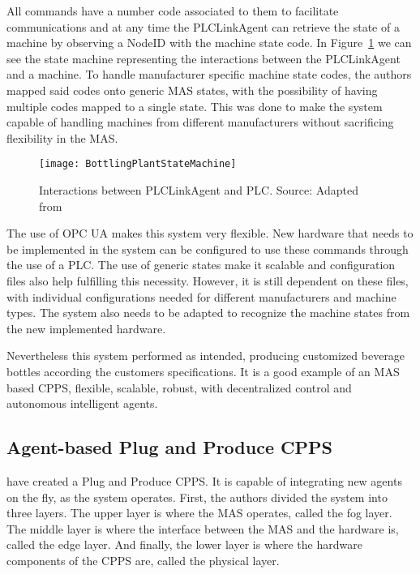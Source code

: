All commands have a number code associated to them to facilitate communications and at any time the PLCLinkAgent can retrieve the state of a machine by observing a NodeID with the machine state code. In Figure~\ref{fig:bottling_plant_state_achine} we can see the state machine representing the interactions between the PLCLinkAgent and a machine. To handle manufacturer specific machine state codes, the authors mapped said codes onto generic MAS states, with the possibility of having multiple codes mapped to a single state. This was done to make the system capable of handling machines from different manufacturers without sacrificing flexibility in the MAS.

\begin{figure}[hbt!]
	\centering
	\texttt{[image: BottlingPlantStateMachine]}
	\caption{Interactions between PLCLinkAgent and PLC. Source: Adapted from \cite{bottling_plant_part2}}
	\label{fig:bottling_plant_state_achine}
\end{figure}

The use of OPC UA makes this system very flexible. New hardware that needs to be implemented in the system can be configured to use these commands through the use of a PLC. The use of generic states make it scalable and configuration files also help fulfilling this necessity. However, it is still dependent on these files, with individual configurations needed for different manufacturers and machine types. The system also needs to be adapted to recognize the machine states from the new implemented hardware.

Nevertheless this system performed as intended, producing customized beverage bottles according the customers specifications. It is a good example of an MAS based CPPS, flexible, scalable, robust, with decentralized control and autonomous intelligent agents.
 
\subsection{Agent-based Plug and Produce CPPS}
\label{agent_plug_and_produce}

\citeauthor{8972169} \cite{8972169} have created a Plug and Produce CPPS. It is capable of integrating new agents on the fly, as the system operates. First, the authors divided the system into three layers. The upper layer is where the MAS operates, called the fog layer. The middle layer is where the interface between the MAS and the hardware is, called the edge layer. And finally, the lower layer is where the hardware components of the CPPS are, called the physical layer.\\

